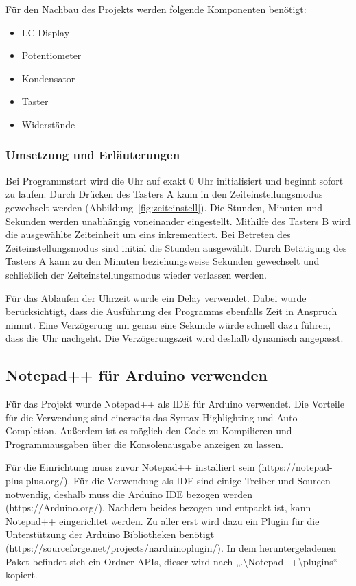 Für den Nachbau des Projekts werden folgende Komponenten benötigt:
\begin{itemize}
\item{LC-Display}
\item{Potentiometer}
\item{Kondensator}
\item{Taster}
\item{Widerstände}
\end{itemize}

\subsubsection{Umsetzung und Erläuterungen}
Bei Programmstart wird die Uhr auf exakt 0 Uhr initialisiert und beginnt sofort zu laufen. Durch Drücken des Tasters A kann in den Zeiteinstellungsmodus gewechselt werden  (Abbildung~\ref{fig:zeiteinstell}). Die Stunden, Minuten und Sekunden werden unabhängig voneinander eingestellt. Mithilfe des Tasters B wird die ausgewählte Zeiteinheit um eins inkrementiert. Bei Betreten des Zeiteinstellungsmodus sind initial die Stunden ausgewählt. Durch Betätigung des Tasters A kann zu den Minuten beziehungsweise Sekunden gewechselt und schließlich der Zeiteinstellungsmodus wieder verlassen werden.

Für das Ablaufen der Uhrzeit wurde ein Delay verwendet. Dabei wurde berücksichtigt, dass die Ausführung des Programms ebenfalls Zeit in Anspruch nimmt. Eine Verzögerung um genau eine Sekunde würde schnell dazu führen, dass die Uhr nachgeht. Die Verzögerungszeit wird deshalb dynamisch angepasst.

\subsection{Notepad++ für Arduino verwenden}

Für das Projekt wurde Notepad++ als IDE für Arduino verwendet. Die Vorteile für die Verwendung sind einerseits das Syntax-Highlighting und Auto-Completion. Außerdem ist es möglich den Code zu Kompilieren und Programmausgaben über die Konsolenausgabe anzeigen zu lassen.

Für die Einrichtung muss zuvor Notepad++ installiert sein (https://notepad-plus-plus.org/). Für die Verwendung als IDE sind einige Treiber und Sourcen notwendig, deshalb muss die Arduino IDE bezogen werden (https://Arduino.org/). Nachdem beides bezogen und entpackt ist, kann Notepad++ eingerichtet werden. Zu aller erst wird dazu ein Plugin für die Unterstützung der Arduino Bibliotheken benötigt (https://sourceforge.net/projects/narduinoplugin/). In dem heruntergeladenen Paket befindet sich ein Ordner APIs, dieser wird nach „.\textbackslash{}Notepad++\textbackslash{}plugins“ kopiert.

